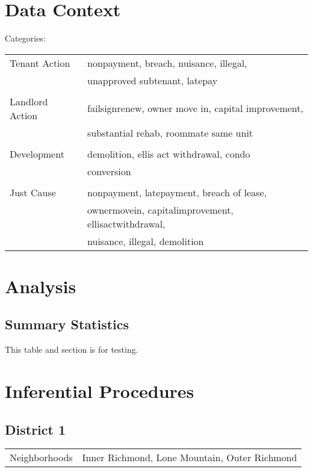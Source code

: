\documentclass[]{article}
\begin{document}
\section{Data Context}
\newline \newline
Categories: \newline \newline
\begin{tabular}{l | l}

	Tenant Action    	& nonpayment, breach, nuisance, illegal,\\& unapproved subtenant, latepay \\							 	\\ 
	Landlord Action     & failsignrenew, owner move in, capital improvement, \\ & substantial rehab, roommate same unit 		\\				 		\\
	Development    		& demolition, ellis act withdrawal, condo \\ & conversion 			\\					\\ 
	Just Cause    		& nonpayment, latepayment, breach of lease, \\ &  ownermovein, capitalimprovement, ellisactwithdrawal, \\ & nuisance, illegal, demolition 				 			\\	
	\end{tabular}

\section{Analysis}
\subsection{Summary Statistics}
This table and section is for testing.

\section{Inferential Procedures}
\subsection{District 1}

\begin{table}[h]
\centering
\begin{tabular}{l | l}
Neighborhoods & Inner Richmond, Lone Mountain, Outer Richmond \\
\end{tabular}
\end{table}
\FloatBarrier
\end{document}
